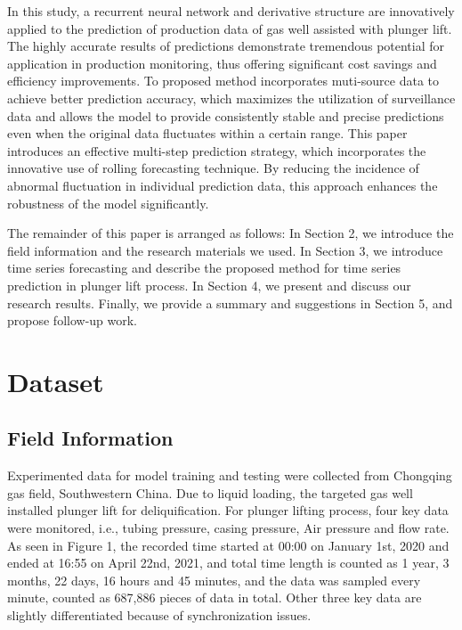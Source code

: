 \documentclass[sn-mathphys,Numbered]{sn-jnl}%
\theoremstyle{thmstyleone}%
\theoremstyle{thmstyletwo}%
\theoremstyle{thmstylethree}%
\begin{document}
In this study, a recurrent neural network and derivative structure are innovatively applied to the prediction of production data of gas well assisted with plunger lift. The highly accurate results of predictions demonstrate tremendous potential for application in production monitoring, thus offering significant cost savings and efficiency improvements. To proposed method incorporates muti-source data to achieve better prediction accuracy, which maximizes the utilization of surveillance data and allows the model to provide consistently stable and precise predictions even when the original data fluctuates within a certain range. This paper introduces an effective multi-step prediction strategy, which incorporates the innovative use of rolling forecasting technique. By reducing the incidence of abnormal fluctuation in individual prediction data, this approach enhances the robustness of the model significantly.

The remainder of this paper is arranged as follows: In Section 2, we introduce the field information and the research materials we used. In Section 3, we introduce time series forecasting and describe the proposed method for time series prediction in plunger lift process. In Section 4, we present and discuss our research results. Finally, we provide a summary and suggestions in Section 5, and propose follow-up work.


\section{Dataset}\label{sec2}
\subsection{Field Information}\label{subsec1}

Experimented data for model training and testing were collected from Chongqing gas field, Southwestern China. Due to liquid loading, the targeted gas well installed plunger lift for deliquification. For plunger lifting process, four key data were monitored, i.e., tubing pressure, casing pressure, Air pressure and flow rate. As seen in Figure 1, the recorded time started at 00:00 on January 1st, 2020 and ended at 16:55 on April 22nd, 2021, and total time length is counted as 1 year, 3 months, 22 days, 16 hours and 45 minutes, and the data was sampled every minute, counted as 687,886 pieces of data in total. Other three key data are slightly differentiated because of synchronization issues. 
\end{document}
